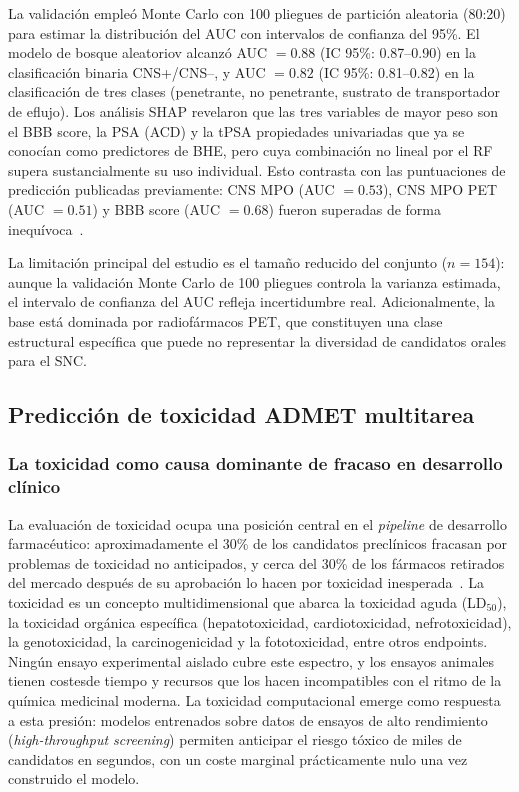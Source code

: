 La validación empleó Monte Carlo con 100 pliegues de partición aleatoria (80:20) para estimar la distribución del AUC con intervalos de confianza del 95\%. El modelo de bosque aleatoriov alcanzó AUC $= 0.88$ (IC 95\%: 0.87–0.90) en la clasificación binaria CNS+/CNS--, y AUC $= 0.82$ (IC 95\%: 0.81–0.82) en la clasificación de tres clases (penetrante, no penetrante, sustrato de transportador de eflujo). Los análisis SHAP revelaron que las tres variables de mayor peso son el BBB score, la PSA (ACD) y la tPSA  propiedades univariadas que ya se conocían como predictores de BHE, pero cuya combinación no lineal por el RF supera sustancialmente su uso individual. Esto contrasta con las puntuaciones de predicción publicadas previamente: CNS MPO (AUC $= 0.53$), CNS MPO PET (AUC $= 0.51$) y BBB score
(AUC $= 0.68$) fueron superadas de forma inequívoca~\cite{spielvogel_enhancing_2025a}.
 
La limitación principal del estudio es el tamaño reducido del conjunto ($n = 154$): aunque la validación Monte Carlo de 100 pliegues controla la varianza estimada, el intervalo de confianza del AUC refleja incertidumbre real. Adicionalmente, la base está dominada por radiofármacos PET, que constituyen una clase estructural específica que puede no representar la diversidad de candidatos orales para el SNC.
 
\subsection{Predicción de toxicidad ADMET multitarea}
\label{ssec:arte_toxicidad}



\subsubsection{La toxicidad como causa dominante de fracaso en desarrollo clínico}
 
La evaluación de toxicidad ocupa una posición central en el \textit{pipeline} de desarrollo farmacéutico: aproximadamente el 30\% de los candidatos preclínicos fracasan por problemas de toxicidad no anticipados, y cerca del 30\% de los fármacos retirados del mercado después de su aprobación lo hacen por toxicidad inesperada~\cite{zhang_computational_2025}. La toxicidad es un concepto multidimensional que abarca la toxicidad aguda (LD$_{50}$), la toxicidad orgánica específica (hepatotoxicidad, cardiotoxicidad, nefrotoxicidad), la genotoxicidad, la carcinogenicidad y la fototoxicidad, entre otros endpoints. Ningún ensayo experimental aislado cubre este espectro, y los ensayos animales tienen costesde tiempo y recursos que los hacen incompatibles con el ritmo de la química medicinal moderna. La toxicidad computacional emerge como respuesta a esta presión: modelos entrenados sobre datos de ensayos de alto rendimiento (\textit{high-throughput screening}) permiten anticipar el riesgo tóxico de miles de candidatos en segundos, con un coste marginal prácticamente nulo una vez construido el modelo.
 
